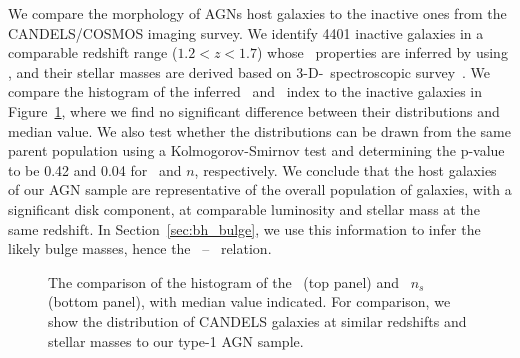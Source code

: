 \documentclass[apj]{emulateapj}
\begin{document}
We compare the morphology of AGNs host galaxies to the inactive ones from the CANDELS/COSMOS imaging survey. We identify 4401 inactive galaxies in a comparable redshift range ($1.2<z<1.7$) whose \sersic\ properties are inferred by \citet{VDwel++2012} using \galfit, and their stellar masses are derived based on 3-D-\hst\ spectroscopic survey~\citep{Momcheva2016, Brammer2012}. We compare the histogram of the inferred \Reff\ and \sersic\ index to the inactive galaxies in Figure~\ref{fig:hist_rn}, where we find no significant difference between their distributions and median value. We also test whether the distributions can be drawn from the same parent population using a Kolmogorov-Smirnov test and determining the p-value to be 0.42 and 0.04 for \Reff\ and $n$, respectively. We conclude that the host galaxies of our AGN sample are representative of the overall population of galaxies, with a significant disk component, at comparable luminosity and stellar mass at the same redshift. In Section~\ref{sec:bh_bulge}, we use this information to infer the likely bulge masses, hence the \mbh\ -- \bmass\ relation.





\begin{figure}[ht]
\caption{\label{fig:hist_rn} 
The comparison of the histogram of the \Reff\ (top panel) and \sersic\ $n_s$ (bottom panel), with median value indicated. For comparison, we show the distribution of CANDELS galaxies at similar redshifts and stellar masses to our type-1 AGN sample.}
\end{figure} 
%
\end{document}
